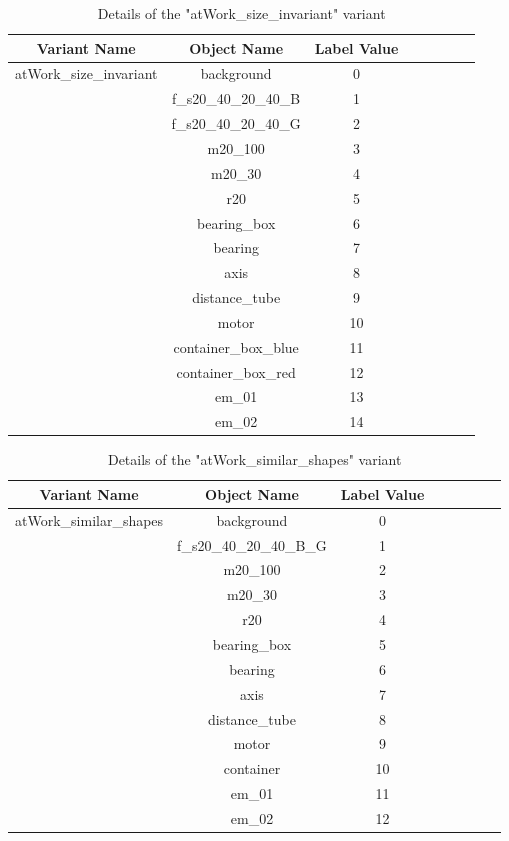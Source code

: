 \documentclass[paper=a4,11pt,parskip=half,toc=listof]{scrartcl}
\begin{document}
\begin{itemize}
		\begin{table}[!htb]
			\centering
			\begin{tabular}{|c|c|c|c|c|c|c|c|}
			\hline 
  			\textbf{Variant Name} & \textbf{Object Name} & \textbf{Label Value} \\ 
			\hline
			\multirow{15}{*}{atWork\_size\_invariant} & background & 0 \\ 
			\cline{2-3}%
			 & f\_s20\_40\_20\_40\_B & 1 \\ 
			\cline{2-3} 
			& f\_s20\_40\_20\_40\_G & 2 \\
			\cline{2-3}
			& m20\_100 & 3 \\
			\cline{2-3} 
			& m20\_30 & 4 \\
			\cline{2-3} 
			& r20 & 5 \\
			\cline{2-3} 
			& bearing\_box & 6 \\
			\cline{2-3} 
			& bearing & 7 \\
			\cline{2-3} 
			& axis & 8 \\
			\cline{2-3} 
			& distance\_tube & 9 \\
			\cline{2-3} 
			& motor & 10 \\
			\cline{2-3} 
			& container\_box\_blue & 11 \\
			\cline{2-3} 
			& container\_box\_red & 12 \\
			\cline{2-3} 
			& em\_01 & 13 \\
			\cline{2-3} 
			& em\_02 & 14 \\
			\hline
			\end{tabular}
			\caption{Details of the "atWork\_size\_invariant" variant} 
			\label{Table:4}
		\end{table}
		
		\begin{table}[!htb]
			\centering
			\begin{tabular}{|c|c|c|c|c|c|c|c|}
			\hline 
  			\textbf{Variant Name} & \textbf{Object Name} & \textbf{Label Value} \\ 
			\hline
			\multirow{13}{*}{atWork\_similar\_shapes} & background & 0 \\ 
			\cline{2-3}%
			 & f\_s20\_40\_20\_40\_B\_G & 1 \\
			\cline{2-3}
			& m20\_100 & 2 \\
			\cline{2-3} 
			& m20\_30 & 3 \\
			\cline{2-3} 
			& r20 & 4 \\
			\cline{2-3} 
			& bearing\_box & 5 \\
			\cline{2-3} 
			& bearing & 6 \\
			\cline{2-3} 
			& axis & 7 \\
			\cline{2-3} 
			& distance\_tube & 8 \\
			\cline{2-3} 
			& motor & 9 \\
			\cline{2-3} 
			& container & 10 \\
			\cline{2-3} 
			& em\_01 & 11 \\
			\cline{2-3} 
			& em\_02 & 12 \\
			\hline
			\end{tabular}
			\caption{Details of the "atWork\_similar\_shapes" variant} 
			\label{Table:5}
		\end{table}
		

\end{itemize}
\end{document}

